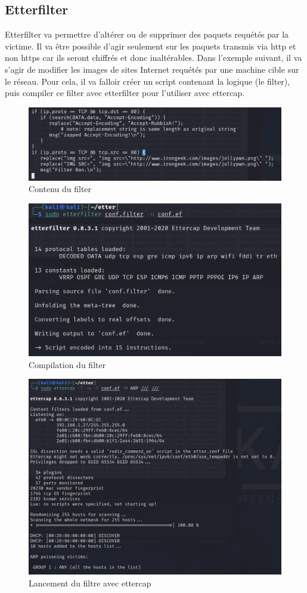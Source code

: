 \documentclass[12pt, oneside]{article}
\begin{document}
\subsection{Etterfilter}
Etterfilter va permettre d'altérer ou de supprimer des paquets requétés par la victime. Il va être possible d'agir seulement sur les paquets transmis via http et non https car ils seront chiffrés et donc inaltérables.
Dans l'exemple suivant, il va s'agir de modifier les images de sites Internet requétés par une machine cible sur le réseau. Pour cela, il va falloir créer un script contenant la logique (le filter), puis compiler ce filter avec etterfilter pour l'utiliser avec ettercap.
\begin{figure}[H]
\centering
\includegraphics[scale=0.4]{filter}
\caption{Contenu du filter}
\end{figure}
\begin{figure}[H]
\centering
\includegraphics[scale=0.4]{compile}
\caption{Compilation du filter}
\end{figure}
\begin{figure}[H]
\centering
\includegraphics[scale=0.4]{cap}
\caption{Lancement du filtre avec ettercap}
\end{figure}
\end{document}
